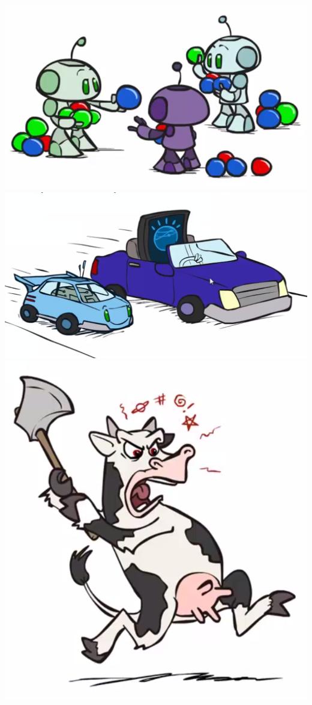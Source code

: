 \documentclass[twocolumn]{article}
\begin{document}
{\includegraphics[scale=0.5]{snapshot156}\\
\includegraphics[scale=0.5]{snapshot160}\\
\includegraphics[scale=0.5]{snapshot161}\\
}
\end{document}
